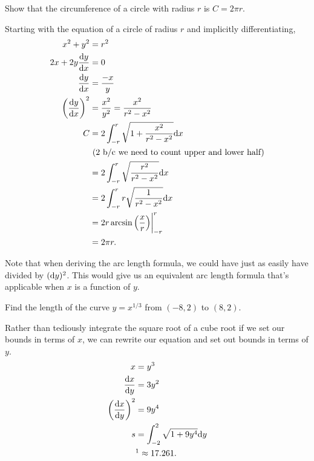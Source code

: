 \begin{example}
	Show that the circumference of a circle with radius $r$ is $C=2\pi r$.
\end{example}
\begin{answer}
	Starting with the equation of a circle of radius $r$ and implicitly differentiating,
	\begin{align*}
		x^2 + y^2 &= r^2 \\
		2x + 2y\frac{\mathrm{d} y}{\mathrm{d} x} &= 0 \\
		\frac{\mathrm{d} y}{\mathrm{d} x} &= \frac{-x}{y} \\
		\left(\frac{\mathrm{d} y}{\mathrm{d} x}\right)^2 &= \frac{x^2}{y^2} = \frac{x^2}{r^2-x^2} \\
		C &= 2\int_{-r}^{r}{\sqrt{1+\frac{x^2}{r^2-x^2}}\mathrm{d} x} \\ 
		&\text{ (2 b/c we need to count upper and lower half)} \\
		&= 2\int_{-r}^{r}{\sqrt{\frac{r^2}{r^2-x^2}}\mathrm{d} x} \\
		&= 2\int_{-r}^{r}{r\sqrt{\frac{1}{r^2-x^2}}\mathrm{d} x} \\
		&= 2r\arcsin{\left(\frac{x}{r}\right)}\biggr\rvert_{-r}^{r} \\
		&= 2\pi r.
	\end{align*}
\end{answer}


Note that when deriving the arc length formula, we could have just as easily have divided by $(\mathrm{d} y)^2$.
This would give us an equivalent arc length formula that's applicable when $x$ is a function of $y$.

\begin{example}
	Find the length of the curve $y=x^{1/3}$ from $(-8,2)$ to $(8,2)$.
\end{example}
\begin{answer}
	Rather than  tediously integrate the square root of a cube root if we set our bounds in terms of $x$, we can rewrite our equation and set out bounds in terms of $y$.
	\begin{align*}
		x &= y^3 \\
		\dd{x}{y} &= 3y^2 \\
		\left(\dd{x}{y}\right)^2 &= 9y^4 \\
		s &= \int_{-2}^{2}{\sqrt{1+9y^4}\d{y}} \\
		&\footnotemark\approx 17.261.
	\end{align*}
\end{answer}
